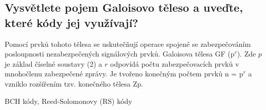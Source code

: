 \subsection{Vysvětlete pojem Galoisovo těleso a uveďte, které kódy jej využívají?}
Pomocí prvků tohoto tělesa se uskutečňují operace spojené se zabezpečováním posloupnosti nezabezpečených signálových prvků. Galoisova tělesa GF (p$^r$). Zde $p$ je základ číselné soustavy (2) a $r$ odpovídá počtu zabezpečovacích prvků v mnohočlenu zabezpečené zprávy. Je tvořeno konečným počtem prvků n = p$^r$  a vzniklo rozšířením tzv. konečného tělesa Zp.

BCH kódy, Reed-Solomonovy (RS) kódy
